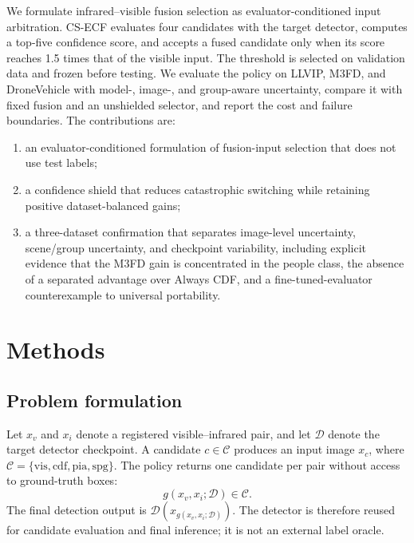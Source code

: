 \documentclass[preprint,11pt]{elsarticle}
\begin{document}
We formulate infrared--visible fusion selection as evaluator-conditioned input
arbitration. CS-ECF evaluates four candidates with the target detector, computes
a top-five confidence score, and accepts a fused candidate only when its score
reaches 1.5 times that of the visible input. The threshold is selected on
validation data and frozen before testing. We evaluate the policy on LLVIP,
M3FD, and DroneVehicle with model-, image-, and group-aware uncertainty,
compare it with fixed fusion and an unshielded selector, and report the cost and
failure boundaries. The contributions are:
\begin{enumerate}
  \item an evaluator-conditioned formulation of fusion-input selection that does
  not use test labels;
  \item a confidence shield that reduces catastrophic switching while retaining
  positive dataset-balanced gains;
  \item a three-dataset confirmation that separates image-level uncertainty,
  scene/group uncertainty, and checkpoint variability, including explicit
  evidence that the M3FD gain is concentrated in the people class, the absence
  of a separated advantage over Always CDF, and a fine-tuned-evaluator
  counterexample to universal portability.
\end{enumerate}

\section{Methods}

\subsection{Problem formulation}

Let \(x_v\) and \(x_i\) denote a registered visible--infrared pair, and let
\(\mathcal{D}\) denote the target detector checkpoint. A candidate
\(c\in\mathcal{C}\) produces an input image \(x_c\), where
\(\mathcal{C}=\{\mathrm{vis},\mathrm{cdf},\mathrm{pia},\mathrm{spg}\}\).
The policy returns one candidate per pair without access to ground-truth boxes:
\begin{equation}
g(x_v,x_i;\mathcal{D})\in\mathcal{C}.
\end{equation}
The final detection output is
\(\mathcal{D}(x_{g(x_v,x_i;\mathcal{D})})\). The detector is therefore reused
for candidate evaluation and final inference; it is not an external label
oracle.
\end{document}
